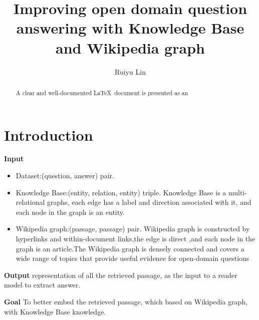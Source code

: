\documentclass[sigconf]{acmart}
\begin{document}
	
	\title{Improving open domain question answering with Knowledge Base and Wikipedia graph}
	
	\author{Ruiyu Lin}
	
	
	\begin{abstract}
		A clear and well-documented \LaTeX\ document is presented as an
		
	\end{abstract}


	\maketitle
	
	\section{Introduction}
	
	\textbf{Input}
		\begin{itemize}
			\item {Dataset}:(question, answer) pair.
			
			\item{ Knowledge Base}:(entity, relation, entity) triple.
			 Knowledge Base is a multi-relational graphs, each edge has a label and direction associated with it, and each node in the graph is an entity.
			 
			 \item{ Wikipedia graph\cite{asai2019learning}}:(passage, passage) pair.
			 Wikipedia graph is constructed by hyperlinks and within-document links,the edge is direct ,and  each node in the graph is an article.The Wikipedia graph is densely connected and covers a wide range of topics that provide useful evidence for open-domain questions
				
		\end{itemize}
		

	\textbf{Output}
	representation of all the retrieved passage, as the input to a reader model to extract answer.
	
	\textbf{Goal} 
	To better embed the retrieved passage, which based on Wikipedia graph, with  Knowledge Base knowledge.
	
\end{document}
